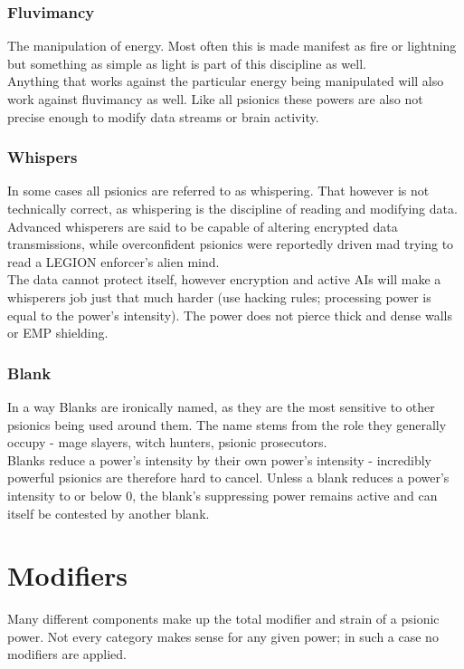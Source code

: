 \documentclass[12pt,a4paper,openany,usenames,dvipsnames]{book}
\begin{document}
	\subsubsection*{Fluvimancy}
	The manipulation of energy. Most often this is made manifest as fire or lightning but something as simple as light is part of this discipline as well.\\
	Anything that works against the particular energy being manipulated will also work against fluvimancy as well. Like all psionics these powers are also not precise enough to modify data streams or brain activity.
	\subsubsection*{Whispers}
	In some cases all psionics are referred to as whispering. That however is not technically correct, as whispering is the discipline of reading and modifying data. Advanced whisperers are said to be capable of altering encrypted data transmissions, while overconfident psionics were reportedly driven mad trying to read a LEGION enforcer's alien mind.\\
	The data cannot protect itself, however encryption and active AIs will make a whisperers job just that much harder (use hacking rules; processing power is equal to the power's intensity). The power does not pierce thick and dense walls or EMP shielding.
	\subsubsection*{Blank}
	In a way Blanks are ironically named, as they are the most sensitive to other psionics being used around them. The name stems from the role they generally occupy - mage slayers, witch hunters, psionic prosecutors.\\
	Blanks reduce a power's intensity by their own power's intensity - incredibly powerful psionics are therefore hard to cancel. Unless a blank reduces a power's intensity to or below 0, the blank's suppressing power remains active and can itself be contested by another blank.
	\section{Modifiers}
	Many different components make up the total modifier and strain of a psionic power. Not every category makes sense for any given power; in such a case no modifiers are applied.
\end{document}
